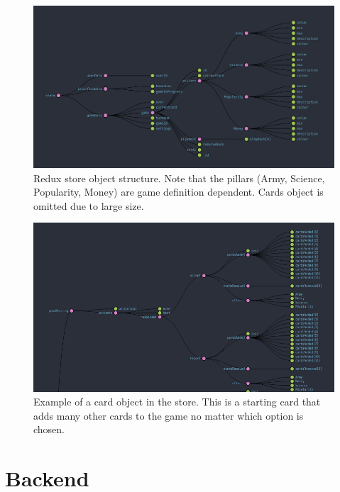 \begin{figure}[!h]
	\centering
	\includegraphics[width=1.0\textwidth]{./images/design/store_shape.png}
	\caption{Redux store object structure. Note that the pillars (Army, Science, Popularity, Money) are game definition dependent. Cards object is omitted due to large size.}
	\label{fig:store_shape}
\end{figure}

\begin{figure}[!h]
	\centering
	\includegraphics[width=1.0\textwidth]{./images/design/card_example.png}
	\caption{Example of a card object in the store. This is a starting card that adds many other cards to the game no matter which option is chosen.}
	\label{fig:card_example}
\end{figure}



\section{Backend}